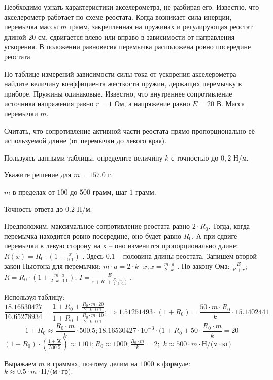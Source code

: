 Необходимо узнать характеристики
акселерометра, не разбирая его. Известно, что акселерометр работает по схеме реостата. Когда возникает сила инерции,
перемычка массы $m$ грамм, закрепленная на пружинах и регулирующая реостат длиной
20 см, сдвигается влево или
вправо в зависимости от направления ускорения. В положении равновесия перемычка
расположена ровно посередине реостата.


По таблице измерений зависимости силы тока от
ускорения акселерометра найдите величину коэффициента жесткости пружин, держащих перемычку в приборе. Пружины
одинаковые. Известно, что
внутреннее сопротивление источника напряжения равно $r = 1$ Ом, а напряжение равно $E = 20$ В.  Масса
перемычки $m$.


Считать, что сопротивление активной части реостата прямо
пропорционально её используемой длине (от перемычки до левого края).

Пользуясь данными таблицы, определите величину $k$ с точностью до $0,2$ Н/м.

Укажите решение для $m=157.0$ г.

\paramSection

$m$ в пределах от $100$ до $500$ грамм, шаг $1$ грамм.  

Точность ответа  до  $0.2$  Н/м.

\solutionSection

Предположим, максимальное сопротивление реостата равно $2 \cdot R_0$. Тогда, когда перемычка находится 
ровно посередине, оно будет равно $R_0$. А при сдвиге перемычки в левую сторону на $х$ – оно изменится 
пропорционально длине: \linebreak $R(x)=R_0 \cdot (1+\frac{x}{0.1})$ . Здесь $0.1$ – половина длины реостата. 
Запишем второй закон Ньютона для перемычки:
$m \cdot a=2 \cdot k \cdot x;  x=\frac{m \cdot a}{2 \cdot k}$   . По закону Ома:   
$\frac{E}{R+r}$; $R=R_0 \cdot \left(1+\frac{m \cdot a}{2 \cdot k \cdot 0.1}\right)$; 
$I=  \frac{E}{r+R_0+\frac{R_0 \cdot m \cdot a}{2 \cdot k \cdot 0.1}}$ . 

Используя таблицу:
$$\frac{18.16530427}{16.65278934}=\frac{1+R_0+\frac{R_0 \cdot m \cdot 20}{2 \cdot k \cdot 0.1}}{1+R_0+\frac{R_0 \cdot m \cdot 10}{2 \cdot k \cdot 0.1}}; \Rightarrow  1.51251493 \cdot (1+R_0 )=\frac{50 \cdot m \cdot R_0}{k} \cdot 15.1402441$$
$$1+R_0 \approx   \frac{R_0 \cdot m}{k}   \cdot 500.5;  18.16530427 \cdot 10^{-3} \cdot (1+R_0+50 \cdot \frac{R_0 \cdot m}{k}=20$$
$(1+R_0 ) \cdot \left(\frac{1+50}{500.5}\right) \approx 1101;  R_0 \approx 1000;   \frac{R_0 \cdot m}{k}=2;$ 
$k \approx 500 \cdot m \cdot \text{Н/(м} \cdot \text{кг}) $  

Выражаем $m$ в граммах, поэтому делим на $1000$ в формуле:  $k \approx 0.5 \cdot m \cdot \text{Н/(м} \cdot \text{гр)}   .$

